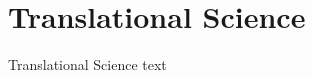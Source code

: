 
\section{Translational Science}\fbeg{}\begin{frame}{}

{\fontsize{20}{23}\selectfont

Translational Science text

}

\end{frame}

